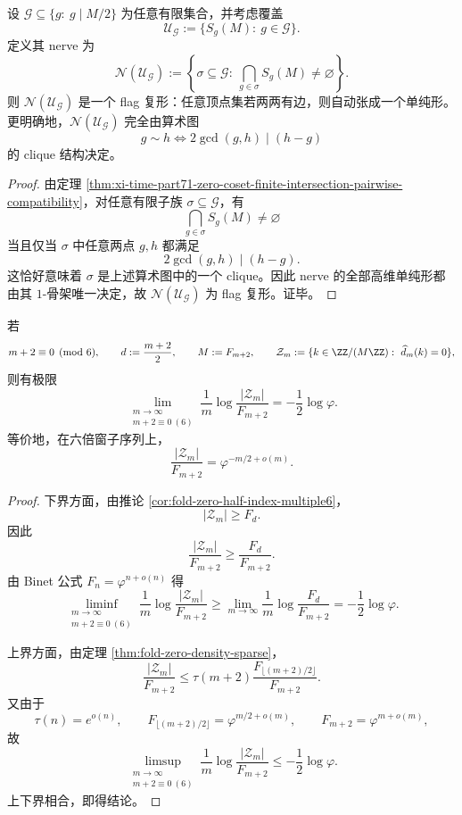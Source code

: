 \begin{corollary}\label{cor:xi-time-part70c-zero-coset-nerve-flag-complex}
设 \(\mathcal G\subseteq\{g:\ g\mid M/2\}\) 为任意有限集合，并考虑覆盖
\[
\mathcal U_{\mathcal G}:=\{S_g(M):\ g\in\mathcal G\}.
\]
定义其 nerve 为
\[
\mathcal N(\mathcal U_{\mathcal G})
:=
\left\{
\sigma\subseteq \mathcal G:\ \bigcap_{g\in \sigma}S_g(M)\neq\varnothing
\right\}.
\]
则 \(\mathcal N(\mathcal U_{\mathcal G})\) 是一个 flag 复形：任意顶点集若两两有边，则自动张成一个单纯形。更明确地，\(\mathcal N(\mathcal U_{\mathcal G})\) 完全由算术图
\[
g\sim h
\iff
2\gcd(g,h)\mid (h-g)
\]
的 clique 结构决定。
\end{corollary}
\begin{proof}
由定理 \ref{thm:xi-time-part71-zero-coset-finite-intersection-pairwise-compatibility}，对任意有限子族 \(\sigma\subseteq \mathcal G\)，有
\[
\bigcap_{g\in \sigma}S_g(M)\neq\varnothing
\]
当且仅当 \(\sigma\) 中任意两点 \(g,h\) 都满足
\[
2\gcd(g,h)\mid (h-g).
\]
这恰好意味着 \(\sigma\) 是上述算术图中的一个 clique。因此 nerve 的全部高维单纯形都由其 \(1\)-骨架唯一决定，故 \(\mathcal N(\mathcal U_{\mathcal G})\) 为 flag 复形。证毕。
\end{proof}

\begin{theorem}[六倍窗上的零点密度具有精确指数率]\label{thm:xi-time-part70c-zero-density-exact-ratio-exponent-multiple6}
若
\[
m+2\equiv 0\pmod 6,
\qquad
d:=\frac{m+2}{2},
\qquad
M:=F_{m+2},
\qquad
\mathcal Z_m:=\{k\in \ZZ/(M\ZZ):\ \widehat d_m(k)=0\},
\]
则有极限
\[
\lim_{\substack{m\to\infty\\ m+2\equiv 0\ (6)}}
\frac1m\log\frac{|\mathcal Z_m|}{F_{m+2}}
=
-\frac12\log\varphi.
\]
等价地，在六倍窗子序列上，
\[
\frac{|\mathcal Z_m|}{F_{m+2}}
=
\varphi^{-m/2+o(m)}.
\]
\end{theorem}
\begin{proof}
下界方面，由推论 \ref{cor:fold-zero-half-index-multiple6}，
\[
|\mathcal Z_m|
\ge
F_d.
\]
因此
\[
\frac{|\mathcal Z_m|}{F_{m+2}}
\ge
\frac{F_d}{F_{m+2}}.
\]
由 Binet 公式 \(F_n=\varphi^{n+o(n)}\) 得
\[
\liminf_{\substack{m\to\infty\\ m+2\equiv 0\ (6)}}
\frac1m\log\frac{|\mathcal Z_m|}{F_{m+2}}
\ge
\lim_{m\to\infty}
\frac1m\log\frac{F_d}{F_{m+2}}
=
-\frac12\log\varphi.
\]

上界方面，由定理 \ref{thm:fold-zero-density-sparse}，
\[
\frac{|\mathcal Z_m|}{F_{m+2}}
\le
\tau(m+2)\frac{F_{\lfloor (m+2)/2\rfloor}}{F_{m+2}}.
\]
又由于
\[
\tau(n)=e^{o(n)},
\qquad
F_{\lfloor (m+2)/2\rfloor}= \varphi^{m/2+o(m)},
\qquad
F_{m+2}=\varphi^{m+o(m)},
\]
故
\[
\limsup_{\substack{m\to\infty\\ m+2\equiv 0\ (6)}}
\frac1m\log\frac{|\mathcal Z_m|}{F_{m+2}}
\le
-\frac12\log\varphi.
\]
上下界相合，即得结论。
\end{proof}

